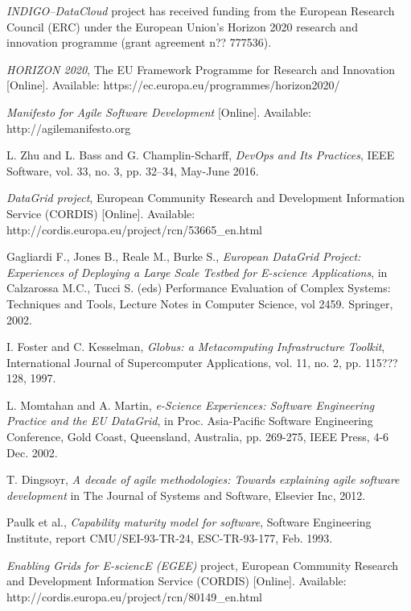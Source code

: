 \documentclass[journal]{IEEEtran}
\begin{document}
{\sl INDIGO--DataCloud} project has received funding from the European Research
Council (ERC) under the European Union's Horizon 2020 research and innovation
programme (grant agreement n?? 777536).

\begin{thebibliography}{1}

\emph{HORIZON 2020}, The EU Framework Programme for Research and Innovation [Online]. Available: https://ec.europa.eu/programmes/horizon2020/

\emph{Manifesto for Agile Software Development} [Online]. Available: http://agilemanifesto.org

L. Zhu and L. Bass and G. Champlin-Scharff, \emph{DevOps and Its Practices},
IEEE Software, vol. 33, no. 3, pp. 32--34, May-June 2016.

\emph{DataGrid project}, European Community Research and Development
Information Service (CORDIS) [Online]. Available: http://cordis.europa.eu/project/rcn/53665\_en.html

Gagliardi F., Jones B., Reale M., Burke S., \emph{European DataGrid Project: Experiences of Deploying a Large Scale Testbed for E-science Applications},
in Calzarossa M.C., Tucci S. (eds) Performance Evaluation of Complex Systems: Techniques and Tools, Lecture Notes in Computer Science, vol 2459. Springer, 2002.

I. Foster and C. Kesselman, \emph{Globus: a Metacomputing Infrastructure
Toolkit}, International Journal of Supercomputer Applications, vol. 11, no. 2,
pp. 115???128, 1997.

L. Momtahan and A. Martin, \emph{e-Science Experiences: Software Engineering
Practice and the EU DataGrid}, in Proc. Asia-Pacific Software Engineering
Conference, Gold Coast, Queensland, Australia, pp. 269-275, IEEE Press,
4-6 Dec. 2002.

T. Dingsoyr, \emph{A decade of agile methodologies: Towards explaining agile
software development} in The Journal of Systems and Software, Elsevier Inc,
2012.

Paulk et al., \emph{Capability maturity model for software}, Software
Engineering Institute, report CMU/SEI-93-TR-24, ESC-TR-93-177, Feb. 1993.

\emph{Enabling Grids for E-sciencE (EGEE)} project, European Community
Research and Development Information Service (CORDIS) [Online]. Available:
http://cordis.europa.eu/project/rcn/80149\_en.html


\end{thebibliography}
\end{document}
